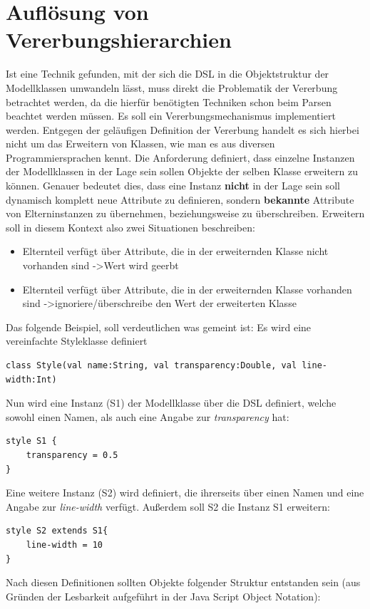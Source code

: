 \section{Auflösung von Vererbungshierarchien}
Ist eine Technik gefunden, mit der sich die DSL in die Objektstruktur der Modellklassen umwandeln lässt, muss direkt die Problematik der Vererbung betrachtet werden, da die hierfür benötigten Techniken schon beim Parsen beachtet werden müssen. Es soll ein Vererbungsmechanismus implementiert werden. Entgegen der geläufigen Definition der Vererbung handelt es sich hierbei nicht um das Erweitern von Klassen, wie man es aus diversen Programmiersprachen kennt. Die Anforderung definiert, dass einzelne Instanzen der Modellklassen in der Lage sein sollen Objekte der selben Klasse erweitern zu können. Genauer bedeutet dies, dass eine Instanz \textbf{nicht} in der Lage sein soll dynamisch komplett neue Attribute zu definieren, sondern \textbf{bekannte} Attribute von Elterninstanzen zu übernehmen, beziehungsweise zu überschreiben. Erweitern soll in diesem Kontext also zwei Situationen beschreiben:
\begin{itemize}
\item Elternteil verfügt über Attribute, die in der erweiternden Klasse nicht vorhanden sind -\textgreater Wert wird geerbt
\item Elternteil verfügt über Attribute, die in der erweiternden Klasse vorhanden sind -\textgreater ignoriere/überschreibe den Wert der erweiterten Klasse
\end{itemize}
Das folgende Beispiel, soll verdeutlichen was gemeint ist:
Es wird eine vereinfachte Styleklasse definiert
\begin{lstlisting}[style=scala]
class Style(val name:String, val transparency:Double, val line-width:Int)
\end{lstlisting}Nun wird eine Instanz (S1) der Modellklasse über die DSL definiert, welche sowohl einen Namen, als auch eine Angabe zur \textit{transparency} hat:
\begin{lstlisting}[style=spray]
style S1 {
    transparency = 0.5
}
\end{lstlisting}Eine weitere Instanz (S2) wird definiert, die ihrerseits über einen Namen und eine Angabe zur \textit{line-width} verfügt. Außerdem soll S2 die Instanz S1 erweitern:
\begin{lstlisting}[style=spray]
style S2 extends S1{
    line-width = 10
}
\end{lstlisting}
Nach diesen Definitionen sollten Objekte folgender Struktur entstanden sein (aus Gründen der Lesbarkeit aufgeführt in der Java Script Object Notation):
